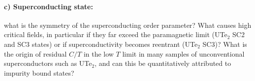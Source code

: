   
  \paragraph {c) Superconducting state:} what is the symmetry of the superconducting order parameter? What causes high critical fields, in particular if they far exceed the paramagnetic limit (UTe$_2$ SC2 and SC3 states) or if superconductivity becomes reentrant (UTe$_2$ SC3)? %
  What is the origin of residual $C/T$ in the low $T$ limit in many samples of unconventional superconductors such as UTe$_2$, and can this be quantitatively attributed to impurity bound states? 
  
  
  
  
  
  
  
